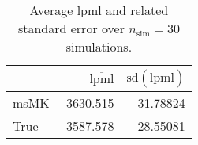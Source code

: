 \begin{table}[H]

\caption{Average lpml and related standard error over $n_{\text{sim}} = 30$ simulations.}
\centering
\begin{tabular}[t]{lrr}
\toprule
  & $\overbar{\text{lpml}}$ & $\text{sd}(\overbar{\text{lpml}})$\\
\midrule
msMK & -3630.515 & 31.78824\\
True & -3587.578 & 28.55081\\
\bottomrule
\end{tabular}
\end{table}